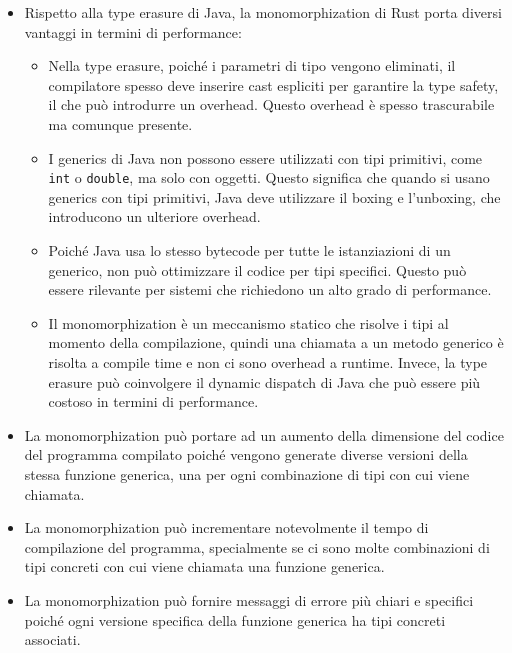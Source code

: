\begin{itemize}
    \item Rispetto alla type erasure di Java, la monomorphization di Rust porta diversi vantaggi in termini di performance:
    \begin{itemize}
        \item Nella type erasure, poiché i parametri di tipo vengono eliminati, il compilatore spesso deve inserire cast espliciti per garantire la type safety, il che può introdurre un overhead. Questo overhead è spesso trascurabile ma comunque presente. 
        \item I generics di Java non possono essere utilizzati con tipi primitivi, come \texttt{int} o \texttt{double}, ma solo con oggetti. Questo significa che quando si usano generics con tipi primitivi, Java deve utilizzare il boxing e l'unboxing, che introducono un ulteriore overhead.
        \item Poiché Java usa lo stesso bytecode per tutte le istanziazioni di un generico, non può ottimizzare il codice per tipi specifici. Questo può essere rilevante per sistemi che richiedono un alto grado di performance.
        \item Il monomorphization è un meccanismo statico che risolve i tipi al momento della compilazione, quindi una chiamata a un metodo generico è risolta a compile time e non ci sono overhead a runtime. Invece, la type erasure può coinvolgere il dynamic dispatch di Java che può essere più costoso in termini di performance.
    \end{itemize}
    \item La monomorphization può portare ad un aumento della dimensione del codice del programma compilato poiché vengono generate diverse versioni della stessa funzione generica, una per ogni combinazione di tipi con cui viene chiamata. 
    \item La monomorphization può incrementare notevolmente il tempo di compilazione del programma, specialmente se ci sono molte combinazioni di tipi concreti con cui viene chiamata una funzione generica.
    \item La monomorphization può fornire messaggi di errore più chiari e specifici poiché ogni versione specifica della funzione generica ha tipi concreti associati.
\end{itemize}

